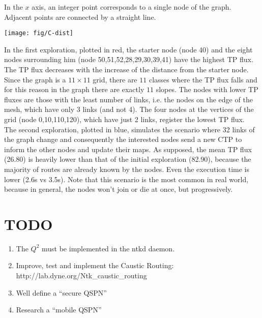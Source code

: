 \documentclass[a4paper]{article}
\newcommand{\href}[2]{ #1 }
\begin{document}
In the $x$ axis, an integer point corresponds to a single node of the graph.
Adjacent points are connected by a straight line.\\
\begin{center}
\label{fig:C-dist}
\texttt{[image: fig/C-dist]}
\end{center}
In the first exploration, plotted in red, the starter node (node 40) and the eight nodes
surrounding him (node 50,51,52,28,29,30,39,41) have the highest TP flux. The TP flux decreases with the
increase of the distance from the starter node. Since the graph is a
$11\times11$ grid, there are $11$ classes where the TP flux falls and for this
reason in the graph there are exactly $11$ slopes. The nodes with lower TP fluxes are
those with the least number of links, i.e. the nodes on the edge of the mesh,
which have only 3 links (and not 4). The four nodes at the vertices of the
grid (node 0,10,110,120), which have just 2
links, register the lowest TP flux.\\
The second exploration, plotted in blue, simulates the scenario where 32 links of the graph
change and consequently the interested nodes send a new CTP to inform the
other nodes and update their maps. As supposed, the mean TP flux (26.80) is heavily
lower than that of the initial exploration (82.90), because the majority of
routes are already known by the nodes. Even the execution time is lower (2.6s
vs 3.5s). Note that this scenario is the most common in real world, because
in general, the nodes won't join or die at once, but progressively.


\section{TODO}
\begin{enumerate}
	\item The $Q^2$ must be implemented in the ntkd daemon.
	\item Improve, test and implement the Caustic Routing:
		\href{http://lab.dyne.org/Ntk\_caustic\_routing}{RFC 0013}
	\item Well define a ``secure QSPN''
	\item Research a ``mobile QSPN''
\end{enumerate}
\end{document}
